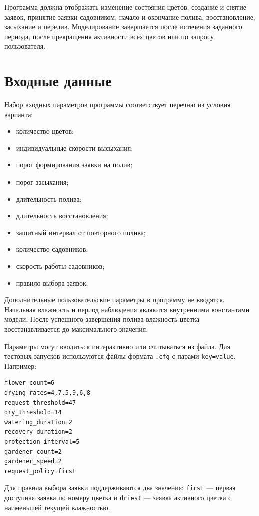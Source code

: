 \documentclass[12pt,a4paper]{article}
\begin{document}
Программа должна отображать изменение состояния цветов, создание и снятие
заявок, принятие заявки садовником, начало и окончание полива, восстановление,
засыхание и перелив. Моделирование завершается после истечения заданного
периода, после прекращения активности всех цветов или по запросу пользователя.

\section{Входные данные}

Набор входных параметров программы соответствует перечню из условия варианта:
\begin{itemize}[noitemsep]
    \item количество цветов;
    \item индивидуальные скорости высыхания;
    \item порог формирования заявки на полив;
    \item порог засыхания;
    \item длительность полива;
    \item длительность восстановления;
    \item защитный интервал от повторного полива;
    \item количество садовников;
    \item скорость работы садовников;
    \item правило выбора заявок.
\end{itemize}

Дополнительные пользовательские параметры в программу не вводятся. Начальная
влажность и период наблюдения являются внутренними константами модели. После
успешного завершения полива влажность цветка восстанавливается до максимального
значения.

Параметры могут вводиться интерактивно или считываться из файла. Для тестовых
запусков используются файлы формата \texttt{.cfg} с парами \texttt{key=value}.
Например:

\begin{lstlisting}
flower_count=6
drying_rates=4,7,5,9,6,8
request_threshold=47
dry_threshold=14
watering_duration=2
recovery_duration=2
protection_interval=5
gardener_count=2
gardener_speed=2
request_policy=first
\end{lstlisting}

Для правила выбора заявки поддерживаются два значения: \texttt{first} --- первая
доступная заявка по номеру цветка и \texttt{driest} --- заявка активного цветка
с наименьшей текущей влажностью.
\end{document}
